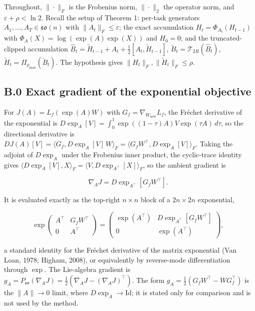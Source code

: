 \documentclass[
]{article}
\begin{document}
Throughout, \(\|\cdot\|_F\) is the Frobenius norm, \(\|\cdot\|_2\) the operator norm, and \(\varepsilon+\rho<\ln 2\). Recall the setup of Theorem 1: per-task generators \(A_1,\dots,A_T\in\mathfrak{so}(n)\) with \(\|A_t\|_F\leq\varepsilon\); the exact accumulation \(H_t=\Phi_{A_t}(H_{t-1})\) with \(\Phi_A(X)=\log(\exp(A)\exp(X))\) and \(H_0=0\); and the truncated-clipped accumulation \(\hat{B}_t=\tilde{H}_{t-1}+A_t+\tfrac{1}{2}[A_t,\tilde{H}_{t-1}]\), \(\breve{B}_t=\mathcal{T}_{2R}(\hat{B}_t)\), \(\tilde{H}_t=\Pi_{\rho_{\max}}(\breve{B}_t)\). The hypothesis gives \(\|H_t\|_F,\|\tilde{H}_t\|_F\leq\rho\).

\subsection{B.0 Exact gradient of the exponential objective}\label{b.0-exact-gradient-of-the-exponential-objective}

For \(J(A)=L_f(\exp(A)W)\) with \(G_f=\nabla_{W_{\mathrm{new}}}L_f\), the Fréchet derivative of the exponential is \(D\exp_A[V]=\int_0^1\exp((1-\tau)A)V\exp(\tau A)\,d\tau\), so the directional derivative is \(DJ(A)[V]=\langle G_f,D\exp_A[V]\,W\rangle_F=\langle G_fW^\top,D\exp_A[V]\rangle_F\). Taking the adjoint of \(D\exp_A\) under the Frobenius inner product, the cyclic-trace identity gives \(\langle D\exp_A[V],X\rangle_F=\langle V,D\exp_{A^\top}[X]\rangle_F\), so the ambient gradient is

\[
\nabla_A J=D\exp_{A^\top}[G_fW^\top].
\]

It is evaluated exactly as the top-right \(n\times n\) block of a \(2n\times 2n\) exponential,

\[
\exp\begin{pmatrix}A^\top & G_fW^\top\\ 0 & A^\top\end{pmatrix}
=\begin{pmatrix}\exp(A^\top) & D\exp_{A^\top}[G_fW^\top]\\ 0 & \exp(A^\top)\end{pmatrix},
\]

a standard identity for the Fréchet derivative of the matrix exponential (Van Loan, 1978; Higham, 2008), or equivalently by reverse-mode differentiation through \(\exp\). The Lie-algebra gradient is \(g_A=P_{\mathfrak{so}}(\nabla_A J)=\tfrac{1}{2}(\nabla_A J-(\nabla_A J)^\top)\). The form \(g_A=\tfrac{1}{2}(G_fW^\top-WG_f^\top)\) is the \(\|A\|\to 0\) limit, where \(D\exp_A\to\mathrm{Id}\); it is stated only for comparison and is not used by the method.
\end{document}
